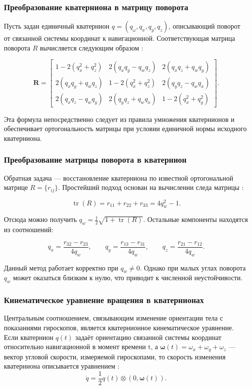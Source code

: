 \subsubsection{Преобразование кватерниона в матрицу поворота}
Пусть задан единичный кватернион $q = (q_{\omega}, q_x, q_y, q_z)$, описывающий поворот от связанной системы координат к навигационной. Соответствующая матрица поворота $R$ вычисляется следующим образом \cite{salamin1974quaternions}:

\begin{equation}
\label{eq:rotation_matrix_from_q}
	\bm{R} = 
		\begin{bmatrix}
			1 - 2(q_x^2 + q_z^2) & 2(q_x q_y - q_w q_z) & 2(q_x q_z + q_w q_y) \\
			2(q_x q_y + q_w q_z) & 1 - 2(q_x^2 + q_z^2) & 2(q_y q_z - q_w q_x) \\
			2(q_x q_z - q_w q_y) & 2(q_y q_z + q_w q_x) & 1 - 2(q_x^2 + q_y^2)
		\end{bmatrix}.
\end{equation}

Эта формула непосредственно следует из правила умножения кватернионов и обеспечивает ортогональность матрицы при условии единичной нормы исходного кватерниона.

\subsubsection{Преобразование матрицы поворота в кватернион}
Обратная задача — восстановление кватерниона по известной ортогональной матрице \( R = \{r_{ij}\} \).  
Простейший подход основан на вычислении следа матрицы \cite{salamin1974quaternions}:  

\[
\operatorname{tr}(R) = r_{11} + r_{22} + r_{33} = 4q_w^2 - 1.
\]

Отсюда можно получить \( q_w = \frac{1}{2} \sqrt{1 + \operatorname{tr}(R)} \). Остальные компоненты находятся из соотношений:

\[
q_x = \frac{r_{32} - r_{23}}{4q_w},\qquad
q_y = \frac{r_{13} - r_{31}}{4q_w},\qquad
q_z = \frac{r_{21} - r_{12}}{4q_w}.
\]

Данный метод работает корректно при \( q_w \neq 0 \). Однако при малых углах поворота \( q_w \) может оказаться близким к нулю, что приводит к численной неустойчивости.


\subsubsection{Кинематическое уравнение вращения в кватернионах}
Центральным соотношением, связывающим изменение ориентации тела с показаниями гироскопов, является кватернионное кинематическое уравнение. Если кватернион $q(t)$ задаёт ориентацию связанной системы координат относительно навигационной в момент времени t, а $\bm{\omega}(t) = \omega_x + \omega_y + \omega_z$ — вектор угловой скорости, измеряемой гироскопами, то скорость изменения кватерниона описывается уравнением \cite{lurie1961analiticheskaya}:
\begin{equation}
\label{eq:q_kinematic_eq}
	\dot{q} = \frac{1}{2} q(t) \otimes (0, \bm{\omega}(t)) \text{.}
\end{equation}


